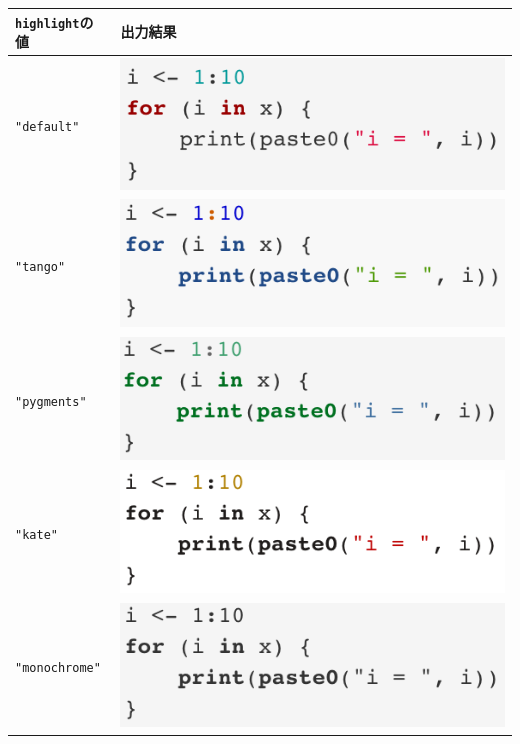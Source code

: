 \documentclass[
  a4paper,
  pandoc,
  ja=standard,
  jafont=haranoaji]{bxjsbook}
\begin{document}
\begin{longtable}[]{@{}ll@{}}
\toprule
\texttt{highlight}の値 & 出力結果 \\
\midrule
\endhead
\texttt{"default"} &
\includegraphics{./Figs/Markdown/Highlight_Default.png} \\
\texttt{"tango"} &
\includegraphics{./Figs/Markdown/Highlight_Tango.png} \\
\texttt{"pygments"} &
\includegraphics{./Figs/Markdown/Highlight_Pygments.png} \\
\texttt{"kate"} &
\includegraphics{./Figs/Markdown/Highlight_Kate.png} \\
\texttt{"monochrome"} &
\includegraphics{./Figs/Markdown/Highlight_Monochrome.png} \\

\end{longtable}
\end{document}
